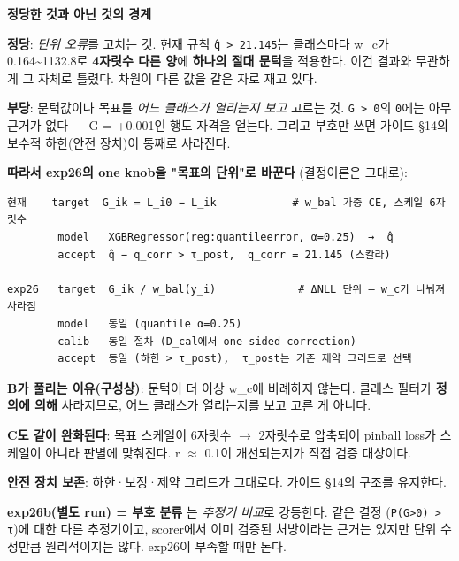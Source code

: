 \textbf{정당한 것과 아닌 것의 경계}

\par\noindent \textbullet\enspace \textbf{정당}: \emph{단위 오류}를 고치는 것. 현재 규칙 \texttt{q̂ > 21.\allowbreak{}145}는 클래스마다 w\_\allowbreak{}c가 0.164\textasciitilde{}1132.8로 \textbf{4자릿수 다른 양}에 \textbf{하나의 절대 문턱}을 적용한다. 이건 결과와 무관하게 그 자체로 틀렸다. 차원이 다른 값을 같은 자로 재고 있다.


\par\noindent \textbullet\enspace \textbf{부당}: 문턱값이나 목표를 \emph{어느 클래스가 열리는지 보고} 고르는 것. \texttt{G > 0}의 \texttt{0}에는 아무 근거가 없다 — G =\allowbreak{} +\allowbreak{}0.001인 행도 자격을 얻는다. 그리고 부호만 쓰면 가이드 §14의 보수적 하한(안전 장치)이 통째로 사라진다.


\textbf{따라서 exp26의 one knob을 "목표의 단위"로 바꾼다} (결정이론은 그대로):


\begin{Verbatim}[breaklines=true,breakanywhere=true,fontsize=\scriptsize]
현재    target  G_ik = L_i0 − L_ik            # w_bal 가중 CE, 스케일 6자릿수
        model   XGBRegressor(reg:quantileerror, α=0.25)  →  q̂
        accept  q̂ − q_corr > τ_post,  q_corr = 21.145 (스칼라)

exp26   target  G_ik / w_bal(y_i)             # ΔNLL 단위 — w_c가 나눠져 사라짐
        model   동일 (quantile α=0.25)
        calib   동일 절차 (D_cal에서 one-sided correction)
        accept  동일 (하한 > τ_post),  τ_post는 기존 제약 그리드로 선택

\end{Verbatim}
\par\noindent \textbullet\enspace \textbf{B가 풀리는 이유(구성상)}: 문턱이 더 이상 w\_\allowbreak{}c에 비례하지 않는다. 클래스 필터가 \textbf{정의에 의해} 사라지므로, 어느 클래스가 열리는지를 보고 고른 게 아니다.


\par\noindent \textbullet\enspace \textbf{C도 같이 완화된다}: 목표 스케일이 6자릿수  \ensuremath{\rightarrow}  2자릿수로 압축되어 pinball loss가 스케일이 아니라 판별에 맞춰진다. r \ensuremath{\approx} 0.1이 개선되는지가 직접 검증 대상이다.


\par\noindent \textbullet\enspace \textbf{안전 장치 보존}: 하한·보정·제약 그리드가 그대로다. 가이드 §14의 구조를 유지한다.


\textbf{exp26b(별도 run) =\allowbreak{} 부호 분류} 는 \emph{추정기 비교}로 강등한다. 같은 결정 (\texttt{P(G>0) >\allowbreak{} τ})에 대한 다른 추정기이고, scorer에서 이미 검증된 처방이라는 근거는 있지만 단위 수정만큼 원리적이지는 않다. exp26이 부족할 때만 돈다.

